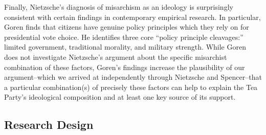 \documentclass[12pt,]{article}
\begin{document}
Finally, Nietzsche's diagnosis of misarchism as an ideology is
surprisingly consistent with certain findings in contemporary empirical
research. In particular, Goren finds that citizens have genuine policy
principles which they rely on for presidential vote choice. He
identifies three core ``policy principle cleavages:'' limited
government, traditional morality, and military strength. While Goren
does not investigate Nietzsche's argument about the specific misarchist
combination of these factors, Goren's findings increase the plausibility
of our argument--which we arrived at independently through Nietzsche and
Spencer--that a particular combination(s) of precisely these factors can
help to explain the Tea Party's ideological composition and at least one
key source of its support.

\subsection{Research Design}\label{research-design}
\end{document}

